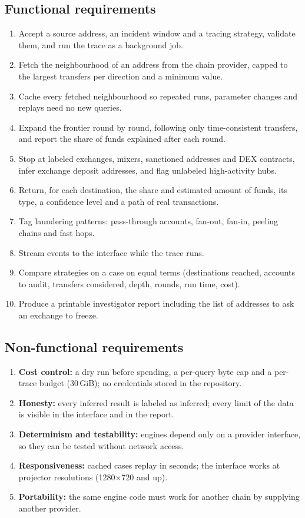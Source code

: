 \subsection{Functional requirements}
\begin{enumerate}[label=FR\arabic*.]
\item Accept a source address, an incident window and a tracing strategy, validate them, and run the trace as a background job.
\item Fetch the neighbourhood of an address from the chain provider, capped to the largest transfers per direction and a minimum value.
\item Cache every fetched neighbourhood so repeated runs, parameter changes and replays need no new queries.
\item Expand the frontier round by round, following only time-consistent transfers, and report the share of funds explained after each round.
\item Stop at labeled exchanges, mixers, sanctioned addresses and DEX contracts, infer exchange deposit addresses, and flag unlabeled high-activity hubs.
\item Return, for each destination, the share and estimated amount of funds, its type, a confidence level and a path of real transactions.
\item Tag laundering patterns: pass-through accounts, fan-out, fan-in, peeling chains and fast hops.
\item Stream events to the interface while the trace runs.
\item Compare strategies on a case on equal terms (destinations reached, accounts to audit, transfers considered, depth, rounds, run time, cost).
\item Produce a printable investigator report including the list of addresses to ask an exchange to freeze.
\end{enumerate}
\subsection{Non-functional requirements}
\begin{enumerate}[label=NFR\arabic*.]
\item \textbf{Cost control:} a dry run before spending, a per-query byte cap and a per-trace budget (30\,GiB); no credentials stored in the repository.
\item \textbf{Honesty:} every inferred result is labeled as inferred; every limit of the data is visible in the interface and in the report.
\item \textbf{Determinism and testability:} engines depend only on a provider interface, so they can be tested without network access.
\item \textbf{Responsiveness:} cached cases replay in seconds; the interface works at projector resolutions (1280$\times$720 and up).
\item \textbf{Portability:} the same engine code must work for another chain by supplying another provider.
\end{enumerate}

